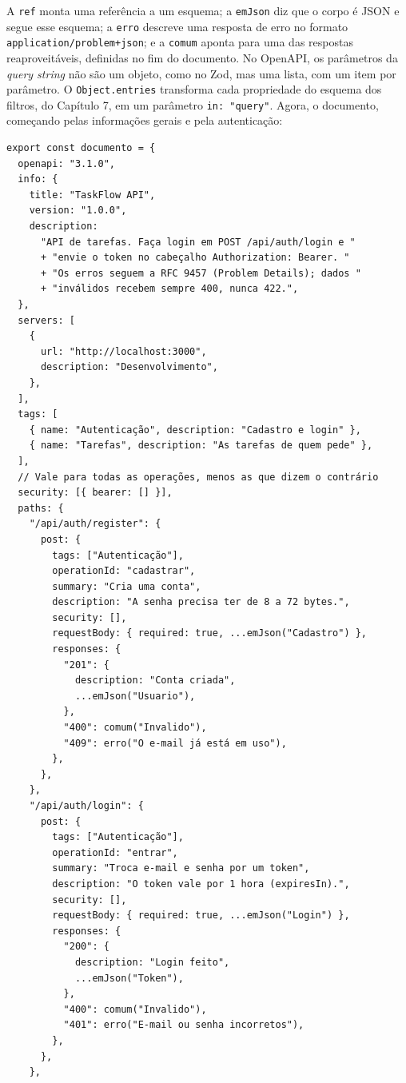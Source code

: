 A \texttt{ref} monta uma referência a um esquema; a \texttt{emJson} diz que o corpo é JSON e segue esse esquema; a \texttt{erro} descreve uma resposta de erro no formato \texttt{application/problem+json}; e a \texttt{comum} aponta para uma das respostas reaproveitáveis, definidas no fim do documento. No OpenAPI, os parâmetros da \textit{query string} não são um objeto, como no Zod, mas uma lista, com um item por parâmetro. O \texttt{Object.entries} transforma cada propriedade do esquema dos filtros, do Capítulo 7, em um parâmetro \texttt{in: "query"}. Agora, o documento, começando pelas informações gerais e pela autenticação:

\begin{codigo}
\begin{Verbatim}[breaklines=true, breaksymbolleft={}, fontsize=\footnotesize]
export const documento = {
  openapi: "3.1.0",
  info: {
    title: "TaskFlow API",
    version: "1.0.0",
    description:
      "API de tarefas. Faça login em POST /api/auth/login e "
      + "envie o token no cabeçalho Authorization: Bearer. "
      + "Os erros seguem a RFC 9457 (Problem Details); dados "
      + "inválidos recebem sempre 400, nunca 422.",
  },
  servers: [
    {
      url: "http://localhost:3000",
      description: "Desenvolvimento",
    },
  ],
  tags: [
    { name: "Autenticação", description: "Cadastro e login" },
    { name: "Tarefas", description: "As tarefas de quem pede" },
  ],
  // Vale para todas as operações, menos as que dizem o contrário
  security: [{ bearer: [] }],
  paths: {
    "/api/auth/register": {
      post: {
        tags: ["Autenticação"],
        operationId: "cadastrar",
        summary: "Cria uma conta",
        description: "A senha precisa ter de 8 a 72 bytes.",
        security: [],
        requestBody: { required: true, ...emJson("Cadastro") },
        responses: {
          "201": {
            description: "Conta criada",
            ...emJson("Usuario"),
          },
          "400": comum("Invalido"),
          "409": erro("O e-mail já está em uso"),
        },
      },
    },
    "/api/auth/login": {
      post: {
        tags: ["Autenticação"],
        operationId: "entrar",
        summary: "Troca e-mail e senha por um token",
        description: "O token vale por 1 hora (expiresIn).",
        security: [],
        requestBody: { required: true, ...emJson("Login") },
        responses: {
          "200": {
            description: "Login feito",
            ...emJson("Token"),
          },
          "400": comum("Invalido"),
          "401": erro("E-mail ou senha incorretos"),
        },
      },
    },
\end{Verbatim}
\end{codigo}

